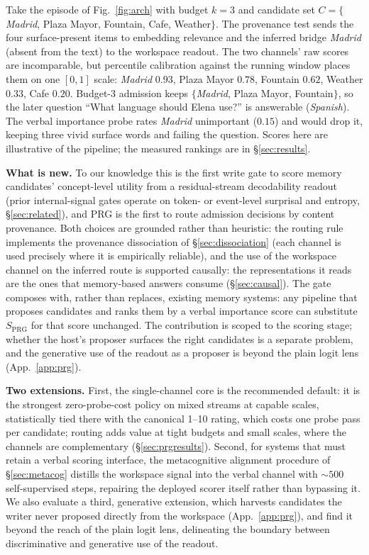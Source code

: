 Take the episode of Fig.~\ref{fig:arch} with budget $k{=}3$ and candidate set
$C{=}\{$\emph{Madrid}, Plaza Mayor, Fountain, Cafe, Weather$\}$. The provenance
test sends the four surface-present items to embedding relevance and the
inferred bridge \emph{Madrid} (absent from the text) to the workspace readout.
The two channels' raw scores are incomparable, but percentile calibration
against the running window places them on one $[0,1]$ scale:
\emph{Madrid} $0.93$, Plaza Mayor $0.78$, Fountain $0.62$, Weather $0.33$,
Cafe $0.20$. Budget-$3$ admission keeps $\{$\emph{Madrid}, Plaza Mayor,
Fountain$\}$, so the later question ``What language should Elena use?'' is
answerable (\emph{Spanish}). The verbal importance probe rates \emph{Madrid}
unimportant ($0.15$) and would drop it, keeping three vivid surface words and
failing the question. Scores here are illustrative of the pipeline; the
measured rankings are in \S\ref{sec:results}.

\textbf{What is new.}
To our knowledge this is the first write gate to score memory candidates'
concept-level utility from a residual-stream decodability readout (prior
internal-signal gates operate on token- or event-level surprisal and entropy,
\S\ref{sec:related}), and PRG is the first to route admission decisions by
content provenance. Both choices are grounded rather than heuristic: the
routing rule implements the provenance dissociation of \S\ref{sec:dissociation}
(each channel is used precisely where it is empirically reliable), and the use
of the workspace channel on the inferred route is supported causally: the
representations it reads are the ones that memory-based answers consume
(\S\ref{sec:causal}). The gate composes with, rather than replaces, existing
memory systems: any pipeline that proposes candidates and ranks them by a
verbal importance score can substitute $S_{\mathrm{PRG}}$ for that score
unchanged. The contribution is scoped to the scoring stage; whether the
host's proposer surfaces the right candidates is a separate problem, and the
generative use of the readout as a proposer is beyond the plain logit lens
(App.~\ref{app:prg}).

\textbf{Two extensions.}
First, the single-channel core is the recommended default: it is the
strongest zero-probe-cost policy on mixed streams at capable scales,
statistically tied there with the canonical 1--10 rating, which costs one
probe pass per candidate; routing adds value at tight budgets and small
scales, where the channels are complementary (\S\ref{sec:prgresults}). Second, for systems
that must retain a verbal scoring interface, the metacognitive alignment
procedure of \S\ref{sec:metacog} distills the workspace signal into the
verbal channel with ${\sim}500$ self-supervised steps, repairing the deployed
scorer itself rather than bypassing it. We also evaluate a third, generative extension, which harvests candidates the
writer never proposed directly from the workspace (App.~\ref{app:prg}), and
find it beyond the reach of the plain logit lens, delineating the boundary
between discriminative and generative use of the readout.

